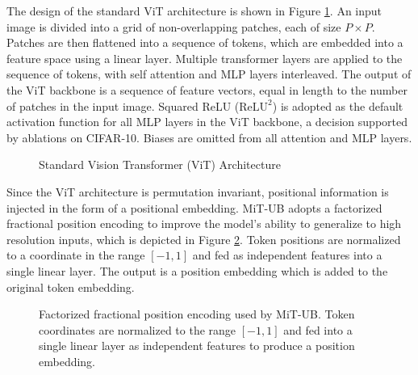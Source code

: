 \documentclass[12pt]{article}
\newcommand{\reluTwo}{$\text{ReLU}^2$}
\begin{document}
The design of the standard ViT architecture is shown in Figure \ref{fig:vit}. An input image is divided into a grid of non-overlapping patches, each of size $P \times P$. 
Patches are then flattened into a sequence of tokens, which are embedded into a feature space using a linear layer.
Multiple transformer layers are applied to the sequence of tokens, with self attention and MLP layers interleaved. 
The output of the ViT backbone is a sequence of feature vectors, equal in length to the number of patches in the input image.
Squared ReLU (\reluTwo) \cite{so2022relu2} is adopted as the default activation function for all MLP layers in the ViT backbone,  
a decision supported by ablations on CIFAR-10. 
Biases are omitted from all attention and MLP layers.

\begin{figure}[H]
    \centering
    
    \caption{Standard Vision Transformer (ViT) Architecture}
    \label{fig:vit}
\end{figure}

Since the ViT architecture is permutation invariant, positional information is injected in the form of a positional embedding.
MiT-UB adopts a factorized fractional position encoding \cite{navit2024} to improve the model's ability to generalize to high resolution inputs, which is depicted in Figure \ref{fig:position-encoding}. 
Token positions are normalized to a coordinate in the range $[-1, 1]$ and fed as independent features into a single linear layer. The output is a position embedding which is added to the original token embedding.


\begin{figure}[H]
    \centering
    
    \caption{Factorized fractional position encoding used by MiT-UB. Token coordinates are normalized to the range $[-1, 1]$ and fed into a single linear layer as independent features to produce a position embedding.
    }
    \label{fig:position-encoding}
\end{figure}
\end{document}
